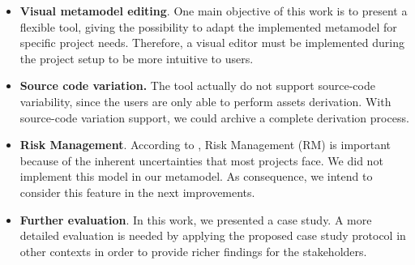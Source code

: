 \begin{itemize}

\item  \textbf{ Visual metamodel editing}. One main objective of this work is to present a flexible tool, giving the possibility to adapt the implemented metamodel for specific project needs. Therefore, a visual editor must be implemented during the project setup to be more intuitive to users.

\item  \textbf{ Source code variation.} The tool actually do not support source-code variability, since the users are only able to perform assets derivation. With source-code variation support, we could archive a complete derivation process.

\item  \textbf{ Risk Management}. According to \cite{Sommerville2011}, Risk Management (RM) is important because of the inherent uncertainties that most projects face. We did not implement this model in our metamodel. As consequence, we intend to consider this feature in the next improvements. 

  
\item  \textbf{ Further evaluation}. In this work, we presented a case study. A more detailed evaluation is needed by applying the proposed case study protocol in other contexts in order to provide richer findings for the stakeholders. 
\end{itemize}
